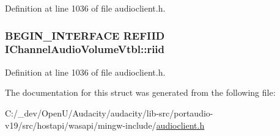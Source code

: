 Definition at line 1036 of file audioclient.\+h.

\subsubsection[{\texorpdfstring{riid}{riid}}]{\setlength{\rightskip}{0pt plus 5cm}B\+E\+G\+I\+N\+\_\+\+I\+N\+T\+E\+R\+F\+A\+CE {\bf R\+E\+F\+I\+ID} I\+Channel\+Audio\+Volume\+Vtbl\+::riid}\hypertarget{struct_i_channel_audio_volume_vtbl_aa8529bbe5dd53fac0d214f5942833f72}{}\label{struct_i_channel_audio_volume_vtbl_aa8529bbe5dd53fac0d214f5942833f72}


Definition at line 1036 of file audioclient.\+h.



The documentation for this struct was generated from the following file\+:\begin{DoxyCompactItemize}
\item 
C\+:/\+\_\+dev/\+Open\+U/\+Audacity/audacity/lib-\/src/portaudio-\/v19/src/hostapi/wasapi/mingw-\/include/\hyperlink{audioclient_8h}{audioclient.\+h}\end{DoxyCompactItemize}
